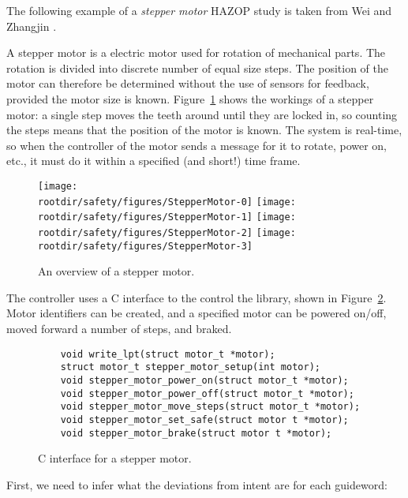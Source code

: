 \begin{example}
The following example of a \emph{stepper motor} HAZOP study is taken from Wei and Zhangjin \cite{wei-hazop-report}.

A stepper motor is a electric motor used for rotation of mechanical parts. The rotation is divided into discrete number of equal size steps. The position of the motor can therefore be determined without the use of sensors for feedback, provided the motor size is known. Figure~\ref{fig:safety:StepperMotor} shows the workings of a stepper motor: a single step moves the teeth around until they are locked in, so counting the steps means that the position of the motor is known. The system is real-time, so when the controller of the motor sends a message for it to rotate, power on, etc., it must do it within a specified (and short!) time frame.

\begin{figure}[!h]
\centering
  \texttt{[image: \\rootdir/safety/figures/StepperMotor-0]}
  \texttt{[image: \\rootdir/safety/figures/StepperMotor-1]}
  \texttt{[image: \\rootdir/safety/figures/StepperMotor-2]}
  \texttt{[image: \\rootdir/safety/figures/StepperMotor-3]}
 \caption{An overview of a stepper motor.}
 \label{fig:safety:StepperMotor}
\end{figure}

The controller uses a C interface to the control the library, shown in Figure~\ref{fig:safety:stepper-motor-interface}. Motor identifiers can be created, and a specified motor can be powered on/off, moved forward a number of steps, and braked.

\begin{figure}[!h]
\begin{verbatim}
    void write_lpt(struct motor_t *motor);
    struct motor_t stepper_motor_setup(int motor);
    void stepper_motor_power_on(struct motor_t *motor);
    void stepper_motor_power_off(struct motor_t *motor);
    void stepper_motor_move_steps(struct motor_t *motor);
    void stepper_motor_set_safe(struct motor t *motor);
    void stepper_motor_brake(struct motor t *motor);
\end{verbatim}
\caption{C interface for a stepper motor.}
\label{fig:safety:stepper-motor-interface}
\end{figure}

First, we need to infer what the deviations from intent are for each guideword:


\end{example}

